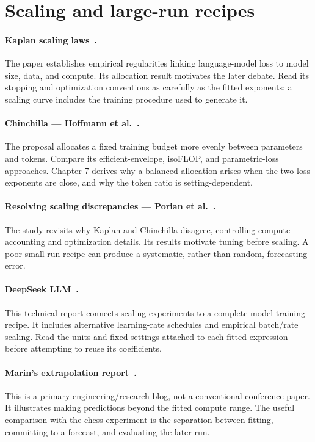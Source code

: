 \section{Scaling and large-run recipes}
\paragraph{Kaplan scaling laws~\cite{kaplan}.}
The paper establishes empirical regularities linking language-model loss to model size, data, and compute. Its allocation result motivates the later debate. Read its stopping and optimization conventions as carefully as the fitted exponents: a scaling curve includes the training procedure used to generate it.

\paragraph{Chinchilla --- Hoffmann et al.~\cite{chinchilla}.}
The proposal allocates a fixed training budget more evenly between parameters and tokens. Compare its efficient-envelope, isoFLOP, and parametric-loss approaches. Chapter 7 derives why a balanced allocation arises when the two loss exponents are close, and why the token ratio is setting-dependent.

\paragraph{Resolving scaling discrepancies --- Porian et al.~\cite{discrepancy}.}
The study revisits why Kaplan and Chinchilla disagree, controlling compute accounting and optimization details. Its results motivate tuning before scaling. A poor small-run recipe can produce a systematic, rather than random, forecasting error.

\paragraph{DeepSeek LLM~\cite{deepseekllm}.}
This technical report connects scaling experiments to a complete model-training recipe. It includes alternative learning-rate schedules and empirical batch/rate scaling. Read the units and fixed settings attached to each fitted expression before attempting to reuse its coefficients.

\paragraph{Marin's extrapolation report~\cite{marinscale}.}
This is a primary engineering/research blog, not a conventional conference paper. It illustrates making predictions beyond the fitted compute range. The useful comparison with the chess experiment is the separation between fitting, committing to a forecast, and evaluating the later run.

